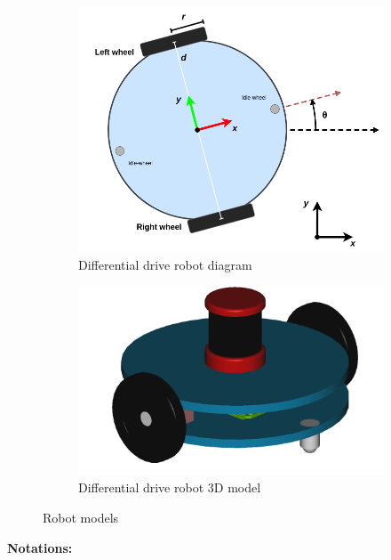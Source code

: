 \documentclass[../main.tex]{subfiles}
\begin{document}
\begin{figure}[H]
	\centering
	\begin{subfigure}{0.45\textwidth}
		\centering
		\includegraphics[width=\textwidth]{IMAGES/part2/robot_model_2.png}
		\caption{Differential drive robot diagram}
		\label{fig:robot_model}
	\end{subfigure}
	\hfill
	\begin{subfigure}{0.45\textwidth}
		\centering
		\includegraphics[width=\textwidth]{IMAGES/part2/robot_3Dmodel.png}
		\caption{Differential drive robot 3D model}
		\label{fig:robot_3Dmodel}
	\end{subfigure}
	\caption{Robot models}
\end{figure}

\textbf{Notations:}
\end{document}
